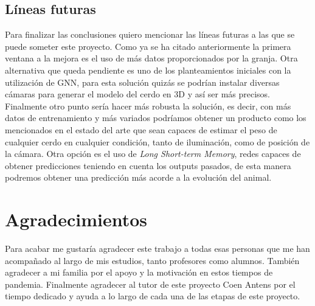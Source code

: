 ﻿\documentclass[10pt,a4paper,twocolumn,twoside]{article}
\begin{document}
\subsection{Líneas futuras}
Para finalizar las conclusiones quiero mencionar las líneas futuras a las que se puede someter este proyecto. Como ya se ha citado anteriormente la primera ventana a la mejora es el uso de más datos proporcionados por la granja. Otra alternativa que queda pendiente es uno de los planteamientos iniciales con la utilización de GNN, para esta solución quizás se podrían instalar diversas cámaras para generar el modelo del cerdo en 3D y así ser más precisos. Finalmente otro punto sería hacer más robusta la solución, es decir, con más datos de entrenamiento y más variados podríamos obtener un producto como los mencionados en el estado del arte que sean capaces de estimar el peso de cualquier cerdo en cualquier condición, tanto de iluminación, como de posición de la cámara.
Otra opción es el uso de \textit{Long Short-term Memory}, redes capaces de obtener predicciones teniendo en cuenta los outputs pasados, de esta manera podremos obtener una predicción más acorde a la evolución del animal.

\section*{Agradecimientos}
Para acabar me gustaría agradecer este trabajo a todas esas personas que me han acompañado al largo de mis estudios, tanto profesores como alumnos.
También agradecer a mi familia por el apoyo y la motivación en estos tiempos de pandemia.
Finalmente agradecer al tutor de este proyecto Coen Antens por el tiempo dedicado y ayuda a lo largo de cada una de las etapas de este proyecto.
\end{document}
